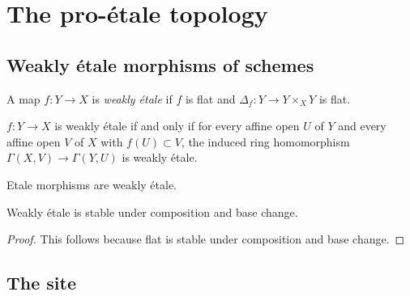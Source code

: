\chapter{The pro-étale topology}

\section{Weakly étale morphisms of schemes}

\begin{definition}
    A map $f \colon Y \to X$ is \emph{weakly étale} if $f$ is flat and
    $\Delta_f\colon Y \to Y \times_{X} Y$ is flat.

    \leanok
    \label{def:weakly-etale-morphism}
\end{definition}

\begin{lemma}
    $f \colon Y \to X$ is weakly étale if and only if
    for every affine open $U$ of $Y$ and every affine open $V$ of $X$ with $f(U) \subset V$,
    the induced ring homomorphism $\Gamma(X, V) \to \Gamma(Y, U)$ is weakly étale.
    \label{lemma:weakly-etale-hasringhomprop}
\end{lemma}

\begin{lemma}
    Etale morphisms are weakly étale.
    \label{lemma:etale-weakly-etale}
\end{lemma}

\begin{lemma}
    Weakly étale is stable under composition and base change.
    \leanok
    \label{lemma:weakly-etale-stable}
\end{lemma}

\begin{proof}
    This follows because flat is stable under composition and base change.
    \leanok
\end{proof}

\section{The site}

